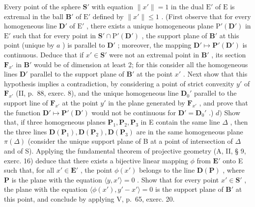 \begin{enumerate}
  Every point of the sphere \(\mathbf{S}'\) with equation \(\| x'\| = 1\) in the dual \(\mathrm{E}'\) of \(\mathrm{E}\) is extremal in the ball \(\mathbf{B}'\) of \(\mathrm{E}'\) defined by \(\| x'\| \leqslant 1\) . (First observe that for every homogeneous line \(\mathbf{D}'\) of \(\mathrm{E}'\) , there exists a unique homogeneous plane \(\mathrm{P}'(\mathbf{D}')\) in \(\mathrm{E}'\) such that for every point in \(\mathbf{S}' \cap \mathrm{P}'(\mathbf{D}')\) , the support plane of \(\mathbf{B}'\) at this point (unique by \(a\) ) is parallel to \(\mathbf{D}'\) ; moreover, the mapping \(\mathbf{D}' \mapsto \mathbf{P}'(\mathbf{D}')\) is continuous. Deduce that if \(x' \in \mathbf{S}'\) were not an extremal point in \(\mathbf{B}'\) , its section \(\mathbf{F}_{x'}\) in \(\mathbf{B}'\) would be of dimension at least 2; for this consider all the homogeneous lines \(\mathbf{D}'\) parallel to the support plane of \(\mathbf{B}'\) at the point \(x'\) . Next show that this hypothesis implies a contradiction, by considering a point of strict convexity \(y'\) of \(\mathbf{F}_{x'}\) (II, p.~88, exerc. 8), and the unique homogeneous line \(\mathbf{D}_0'\) parallel to the support line of \(\mathbf{F}_{x'}\) at the point \(y'\) in the plane generated by \(\mathbf{F}_{x'}\) , and prove that the function \(\mathbf{D}' \mapsto \mathbf{P}'(\mathbf{D}')\) would not be continuous for \(\mathbf{D}' = \mathbf{D}_0'\) .) \(d)\) Show that, if three homogeneous planes \(\mathbf{P}_1, \mathbf{P}_2, \mathbf{P}_3\) in E contain the same line \(\Delta\) , then the three lines \(\mathbf{D}(\mathbf{P}_1), \mathbf{D}(\mathbf{P}_2), \mathbf{D}(\mathbf{P}_3)\) are in the same homogeneous plane \(\pi(\Delta)\) (consider the unique support plane of B at a point of intersection of \(\Delta\) and of S). Applying the fundamental theorem of projective geometry (A, II, § 9, exerc. 16) deduce that there exists a bijective linear mapping \(\phi\) from \(\mathbf{E}'\) onto E such that, for all \(x' \in \mathbf{E}'\) , the point \(\phi(x')\) belongs to the line \(\mathbf{D}(\mathbf{P})\) , where \(\mathbf{P}\) is the plane with the equation \(\langle y, x' \rangle = 0\) . Show that for every point \(x' \in \mathbf{S}'\) , the plane with the equation \(\langle \phi(x'), y' - x' \rangle = 0\) is the support plane of \(\mathbf{B}'\) at this point, and conclude by applying V, p.~65, exerc. 20.
\end{enumerate}

